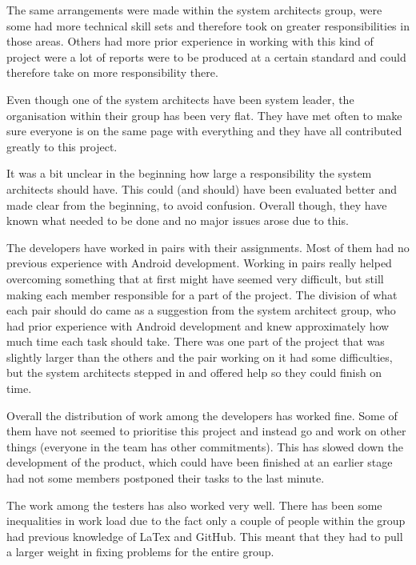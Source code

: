 \documentclass[a4paper]{article}
\begin{document}
The same arrangements were made within the system architects group, were some had more technical skill sets and therefore took on greater responsibilities in those areas. Others had more prior experience in working with this kind of project were a lot of reports were to be produced at a certain standard and could therefore take on more responsibility there.

Even though one of the system architects have been system leader, the organisation within their group has been very flat. They have met often to make sure everyone is on the same page with everything and they have all contributed greatly to this project.

It was a bit unclear in the beginning how large a responsibility the system architects should have. This could (and should) have been evaluated better and made clear from the beginning, to avoid confusion. Overall though, they have known what needed to be done and no major issues arose due to this.

The developers have worked in pairs with their assignments. Most of them had no previous experience with Android development. Working in pairs really helped overcoming something that at first might have seemed very difficult, but still making each member responsible for a part of the project. The division of what each pair should do came as a suggestion from the system architect group, who had prior experience with Android development and knew approximately how much time each task should take. There was one part of the project that was slightly larger than the others and the pair working on it had some difficulties, but the system architects stepped in and offered help so they could finish on time.

Overall the distribution of work among the developers has worked fine. Some of them have not seemed to prioritise this project and instead go and work on other things (everyone in the team has other commitments). This has slowed down the development of the product, which could have been finished at an earlier stage had not some members postponed their tasks to the last minute. 

The work among the testers has also worked very well. There has been some inequalities in work load due to the fact only a couple of people within the group had previous knowledge of LaTex and GitHub. This meant that they had to pull a larger weight in fixing problems for the entire group.


\end{document}
